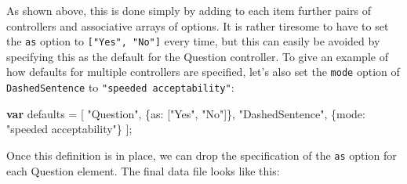 \documentclass[
]{article}
\newenvironment{Shaded}{}{}
\newcommand{\DataTypeTok}[1]{\textcolor[rgb]{0.56,0.13,0.00}{#1}}
\newcommand{\KeywordTok}[1]{\textcolor[rgb]{0.00,0.44,0.13}{\textbf{#1}}}
\newcommand{\NormalTok}[1]{#1}
\newcommand{\OperatorTok}[1]{\textcolor[rgb]{0.40,0.40,0.40}{#1}}
\newcommand{\StringTok}[1]{\textcolor[rgb]{0.25,0.44,0.63}{#1}}
\begin{document}
As shown above, this is done simply by adding to each item further pairs
of controllers and associative arrays of options. It is rather tiresome
to have to set the \texttt{as} option to \texttt{{[}"Yes",\ "No"{]}}
every time, but this can easily be avoided by specifying this as the
default for the Question controller. To give an example of how defaults
for multiple controllers are specified, let's also set the \texttt{mode}
option of \texttt{DashedSentence} to \texttt{"speeded\ acceptability"}:

\begin{Shaded}
\begin{Highlighting}[]
    \KeywordTok{var}\NormalTok{ defaults }\OperatorTok{=}\NormalTok{ [}
        \StringTok{"Question"}\OperatorTok{,}\NormalTok{ \{}\DataTypeTok{as}\OperatorTok{:}\NormalTok{ [}\StringTok{"Yes"}\OperatorTok{,} \StringTok{"No"}\NormalTok{]\}}\OperatorTok{,}
        \StringTok{"DashedSentence"}\OperatorTok{,}\NormalTok{ \{}\DataTypeTok{mode}\OperatorTok{:} \StringTok{"speeded acceptability"}\NormalTok{\}}
\NormalTok{    ]}\OperatorTok{;}
\end{Highlighting}
\end{Shaded}

Once this definition is in place, we can drop the specification of the
\texttt{as} option for each Question element. The final data file looks
like this:
\end{document}
